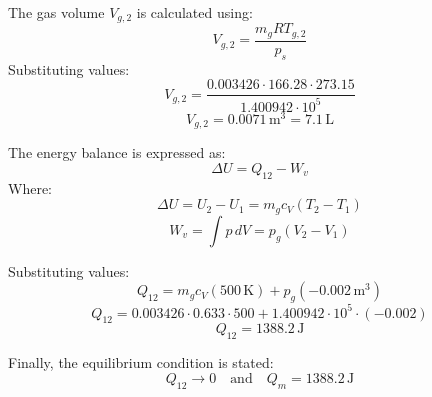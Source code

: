 The gas volume \( V_{g,2} \) is calculated using:  
\[
V_{g,2} = \frac{m_g R T_{g,2}}{p_s}
\]  
Substituting values:  
\[
V_{g,2} = \frac{0.003426 \cdot 166.28 \cdot 273.15}{1.400942 \cdot 10^5}
\]  
\[
V_{g,2} = 0.0071 \, \text{m}^3 = 7.1 \, \text{L}
\]  

The energy balance is expressed as:  
\[
\Delta U = Q_{12} - W_v
\]  
Where:  
\[
\Delta U = U_2 - U_1 = m_g c_V (T_2 - T_1)
\]  
\[
W_v = \int p \, dV = p_g (V_2 - V_1)
\]  

Substituting values:  
\[
Q_{12} = m_g c_V (500 \, \text{K}) + p_g (-0.002 \, \text{m}^3)
\]  
\[
Q_{12} = 0.003426 \cdot 0.633 \cdot 500 + 1.400942 \cdot 10^5 \cdot (-0.002)
\]  
\[
Q_{12} = 1388.2 \, \text{J}
\]  

Finally, the equilibrium condition is stated:  
\[
Q_{12} \to 0 \quad \text{and} \quad Q_m = 1388.2 \, \text{J}
\]